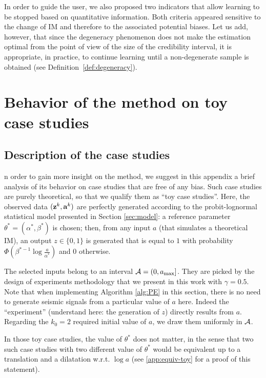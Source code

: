 In order to guide the user, we also proposed two indicators that allow learning to be stopped based on quantitative information. Both criteria appeared sensitive to the change of IM and therefore to the associated potential biases. Let us add, however, that since the degeneracy phenomenon does not make the estimation optimal from the point of view of the size of the credibility interval, it is appropriate, in practice, to continue learning until a non-degenerate sample is obtained (see Definition~\ref{def:degeneracy}).



\section{Behavior of the method on toy case studies}\label{app:doe:toycases}

    \subsection{Description of the case studies}
    

    n order to gain more insight on the method, we suggest in this appendix a brief analysis of its behavior on case studies that are free of any bias. 
    Such case studies are purely theoretical, so that we qualify them as ``toy case studies''. Here, the observed data $(\mathbf{z}^k,\mathbf{a}^k)$ are perfectly generated according to the probit-lognormal statistical model presented in Section \ref{sec:model}:
    a reference parameter $\theta^\ast=(\alpha^\ast,\beta^\ast)$ is chosen; then, from any input $a$ (that simulates a theoretical IM), an output $z\in\{0,1\}$ is generated that is equal to $1$ with probability $\Phi\left(\beta^{\ast -1}\log\frac{a}{\alpha^{\ast}}\right)$ and $0$ otherwise.
    
    The selected inputs belong to an interval $\mathcal{A}=(0,a_{\text{max}}]$.
    They are picked by the {design} of experiments methodology that we present in this work with $\gamma=0.5$. Note that when implementing Algorithm \ref{alg:PE} in this section, there is no need to generate seismic signals from a particular value of $a$ here. Indeed the ``experiment'' (understand here: the generation of $z$) directly results from $a$.
    Regarding the $k_0=2$ required initial value of $a$, we draw them uniformly in $\mathcal{A}$.
    
    In those toy case studies, the value of $\theta^\ast$ does not matter, in the sense that two such case studies with two different value of $\theta^\ast$ would be equivalent up to a translation and a dilatation w.r.t. $\log a$ (see \ref{app:equiv-toy} for a proof of this statement).
    
